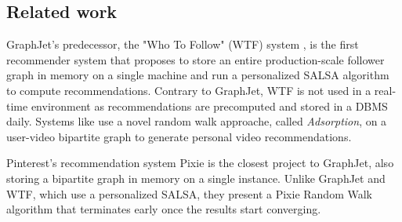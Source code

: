 \subsection{Related work}
\label{subsec:graphjet-related-work}
GraphJet's predecessor, the "Who To Follow" (WTF) system \cite{goel2015follow, gupta2013wtf}, is the first recommender system that proposes to store an entire production-scale follower graph in memory on a single machine and run a personalized SALSA algorithm to compute recommendations. Contrary to GraphJet, WTF is not used in a real-time environment as recommendations are precomputed and stored in a DBMS daily. Systems like \cite{baluja2008video} use a novel random walk approache, called \emph{Adsorption}, on a user-video bipartite graph to generate personal video recommendations.


Pinterest's recommendation system Pixie \cite{eksombatchai2018pixie} is the closest project to GraphJet, also storing a bipartite graph in memory on a single instance. Unlike GraphJet and WTF, which use a personalized SALSA, they present a Pixie Random Walk algorithm that terminates early once the results start converging.
